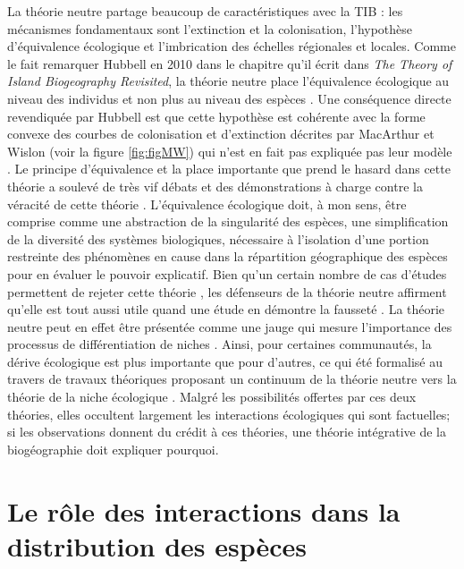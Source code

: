 La théorie neutre partage beaucoup de caractéristiques avec la TIB : les
mécanismes fondamentaux sont l'extinction et la colonisation,
l'hypothèse d'équivalence écologique et l'imbrication des échelles
régionales et locales. Comme le fait remarquer Hubbell en 2010 dans le
chapitre qu'il écrit dans \emph{The Theory of Island Biogeography
Revisited}, la théorie neutre place l'équivalence écologique au niveau
des individus et non plus au niveau des espèces \citep{Hubbell2010}. Une
conséquence directe revendiquée par Hubbell est que cette hypothèse est
cohérente avec la forme convexe des courbes de colonisation et
d'extinction décrites par MacArthur et Wislon (voir la figure
\ref{fig:figMW}) qui n'est en fait pas expliquée pas leur modèle
\citep{Hubbell2010}. Le principe d'équivalence et la place importante
que prend le hasard dans cette théorie a soulevé de très vif débats et
des démonstrations à charge contre la véracité de cette théorie
\citep[voir par exemple][ et \citet{Ricklefs2003}]{McGill2003}.
L'équivalence écologique doit, à mon sens, être comprise comme une
abstraction de la singularité des espèces, une simplification de la
diversité des systèmes biologiques, nécessaire à l'isolation d'une
portion restreinte des phénomènes en cause dans la répartition
géographique des espèces pour en évaluer le pouvoir explicatif. Bien
qu'un certain nombre de cas d'études permettent de rejeter cette théorie
\citep{McGill2003, John2007}, les défenseurs de la théorie neutre
affirment qu'elle est tout aussi utile quand une étude en démontre la
fausseté \citep{Rosindell2012}. La théorie neutre peut en effet être
présentée comme une jauge qui mesure l'importance des processus de
différentiation de niches \citep{Wennekes2012}. Ainsi, pour certaines
communautés, la dérive écologique est plus importante que pour d'autres,
ce qui été formalisé au travers de travaux théoriques proposant un
continuum de la théorie neutre vers la théorie de la niche écologique
\citep{Gravel2006a}. Malgré les possibilités offertes par ces deux
théories, elles occultent largement les interactions écologiques qui
sont factuelles; si les observations donnent du crédit à ces théories,
une théorie intégrative de la biogéographie doit expliquer pourquoi.

\section*{Le rôle des interactions dans la distribution des
espèces}\label{le-ruxf4le-des-interactions-dans-la-distribution-des-espuxe8ces}

